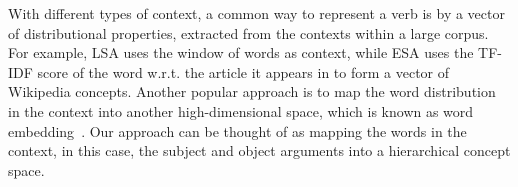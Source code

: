 With different types of context, a common way to represent a verb is by
a vector of distributional properties, extracted from the contexts within
a large corpus. For example, LSA \cite{deerwester1990indexing}
uses the window of words as context,
while ESA \cite{gabrilovich2007computing} uses the TF-IDF score of the word w.r.t.
the article it appears in to form a vector of Wikipedia concepts.
Another popular approach is to map the word distribution in the context
into another high-dimensional space, which is known as word embedding~\cite{mikolov2013distributed}.
Our approach can be thought of as mapping the words in the context, in this
case, the subject and object arguments into a hierarchical concept space.
